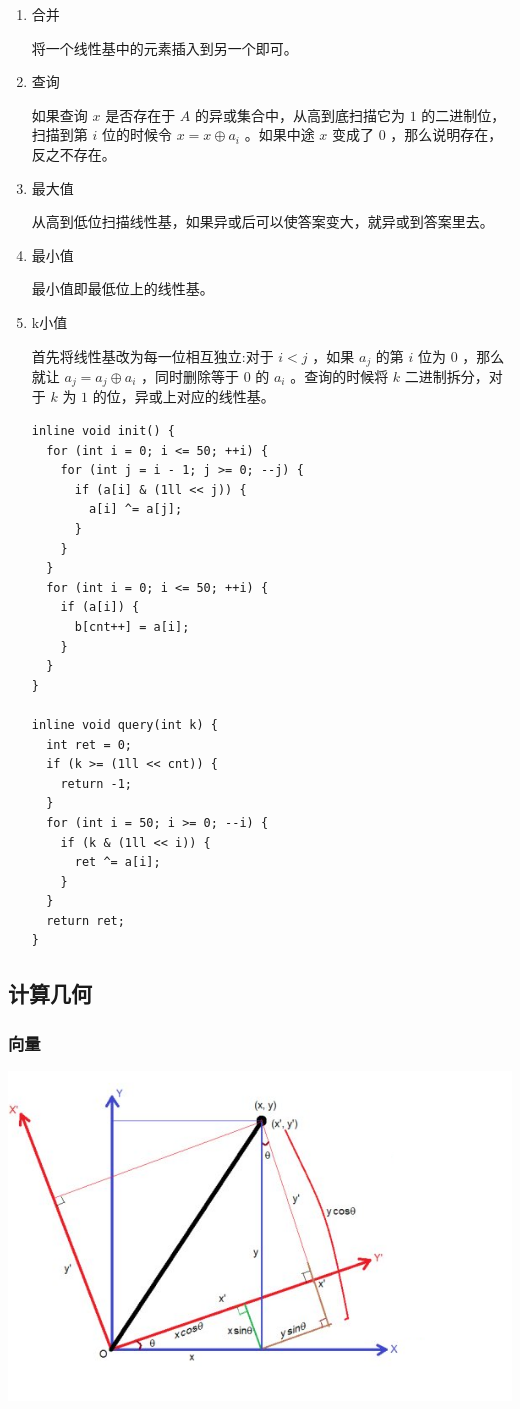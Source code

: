 \documentclass[11pt]{article}
\begin{document}
\begin{enumerate}
\begin{enumerate}
\item 合并
\label{sec-3-1-2-3-2}

将一个线性基中的元素插入到另一个即可。

\item 查询
\label{sec-3-1-2-3-3}

如果查询 $x$ 是否存在于 $A$ 的异或集合中，从高到底扫描它为 $1$ 的二进制位，扫描到第 $i$ 位的时候令 $x=x \oplus a_i$ 。如果中途 $x$ 变成了 $0$ ，那么说明存在，反之不存在。

\item 最大值
\label{sec-3-1-2-3-4}

从高到低位扫描线性基，如果异或后可以使答案变大，就异或到答案里去。

\item 最小值
\label{sec-3-1-2-3-5}

最小值即最低位上的线性基。

\item k小值
\label{sec-3-1-2-3-6}

首先将线性基改为每一位相互独立:对于 $i < j$ ，如果 $a_j$ 的第 $i$ 位为 $0$ ，那么就让 $a_j=a_j \oplus a_i$ ，同时删除等于 $0$ 的 $a_i$ 。查询的时候将 $k$ 二进制拆分，对于 $k$ 为 $1$ 的位，异或上对应的线性基。

\begin{verbatim}
inline void init() {
  for (int i = 0; i <= 50; ++i) {
    for (int j = i - 1; j >= 0; --j) {
      if (a[i] & (1ll << j)) {
        a[i] ^= a[j];
      }
    }
  }
  for (int i = 0; i <= 50; ++i) {
    if (a[i]) {
      b[cnt++] = a[i];
    }
  }
}

inline void query(int k) {
  int ret = 0;
  if (k >= (1ll << cnt)) {
    return -1;
  }
  for (int i = 50; i >= 0; --i) {
    if (k & (1ll << i)) {
      ret ^= a[i];
    }
  }
  return ret;
}
\end{verbatim}
\end{enumerate}
\end{enumerate}
\subsection{计算几何}
\label{sec-3-2}
\subsubsection{向量}
\label{sec-3-2-1}

\includegraphics[width=.9\linewidth]{./Source/Picture/vector.png}
\end{document}
